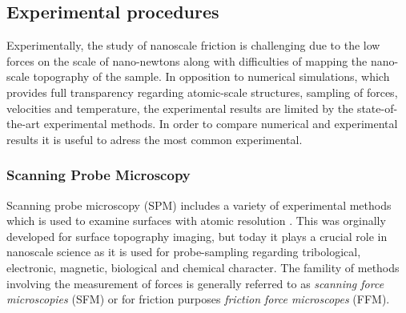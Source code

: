 



\subsection{Experimental procedures}



Experimentally, the study of nanoscale friction is challenging due to the low
forces on the scale of nano-newtons along with difficulties of mapping the
nano-scale topography of the sample. In opposition to numerical simulations, which provides full
transparency regarding atomic-scale structures, sampling of forces, velocities
and temperature, the experimental results are limited by the state-of-the-art
experimental methods. In order to compare numerical and experimental results it is useful to adress the most common experimental.

\subsubsection{Scanning Probe Microscopy}\label{sec:SPM} Scanning probe
microscopy (\acrshort{SPM}) includes a variety of experimental methods which is used to
examine surfaces with atomic resolution \cite[pp. 6-27]{BHUSHAN20051507}. This was
orginally developed for surface topography imaging, but today it plays a crucial
role in nanoscale science as it is used for probe-sampling regarding
tribological, electronic, magnetic, biological and chemical character. The
famility of methods involving the measurement of forces is generally referred to
as \textit{scanning force microscopies} (\acrshort{SFM}) or for friction purposes
\textit{friction force microscopes} (\acrshort{FFM}).

